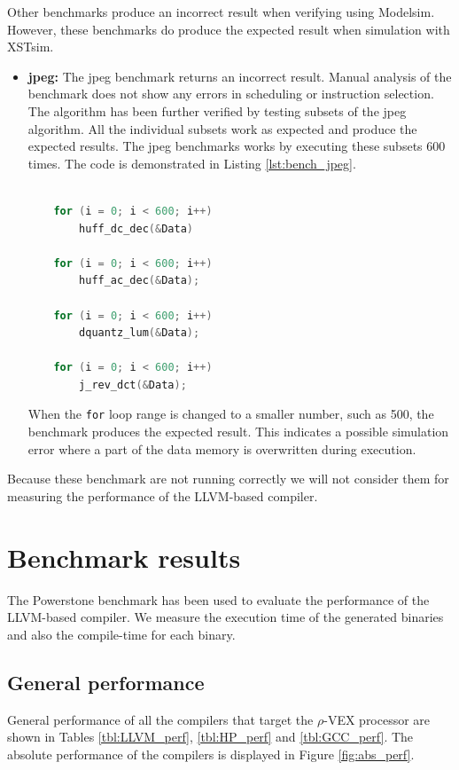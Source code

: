 Other benchmarks produce an incorrect result when verifying using Modelsim. However, these benchmarks do produce the expected result when simulation with XSTsim.

\begin{itemize}
	\item \textbf{jpeg:} The jpeg benchmark returns an incorrect result. Manual analysis of the benchmark does not show any errors in scheduling or instruction selection. The algorithm has been further verified by testing subsets of the jpeg algorithm. All the individual subsets work as expected and produce the expected results. The jpeg benchmarks works by executing these subsets 600 times. The code is demonstrated in Listing \ref{lst:bench_jpeg}.

\begin{lstlisting}[language=c, label=lst:bench_jpeg, caption={\texttt{jpeg} code example}]

	for (i = 0; i < 600; i++)
		huff_dc_dec(&Data)

	for (i = 0; i < 600; i++)
		huff_ac_dec(&Data);

	for (i = 0; i < 600; i++)
		dquantz_lum(&Data);

	for (i = 0; i < 600; i++)
		j_rev_dct(&Data);

\end{lstlisting}

When the \texttt{for} loop range is changed to a smaller number, such as 500, the benchmark produces the expected result. This indicates a possible simulation error where a part of the data memory is overwritten during execution.
\end{itemize}

Because these benchmark are not running correctly we will not consider them for measuring the performance of the LLVM-based compiler.


\section{Benchmark results}
The Powerstone benchmark has been used to evaluate the performance of the LLVM-based compiler. We measure the execution time of the generated binaries and also the compile-time for each binary. 

\subsection{General performance}
General performance of all the compilers that target the $\rho$-VEX processor are shown in Tables \ref{tbl:LLVM_perf}, \ref{tbl:HP_perf} and \ref{tbl:GCC_perf}. The absolute performance of the compilers is displayed in Figure \ref{fig:abs_perf}.

